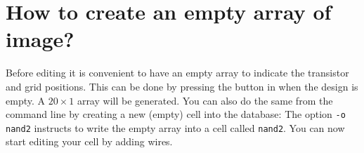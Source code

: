 \section{How to create an empty array of image?}
Before editing it is convenient to have an empty array to indicate the
transistor and grid positions.  This can be done by pressing the button
 in  when the design is empty. A $20 \times
1$ array will be generated.  You can also do the same from the command
line by creating a new (empty) cell into the database:
The option {\tt -o nand2} instructs  to write the empty
array into a cell called {\tt nand2}.
You can now start editing your cell by adding wires.

